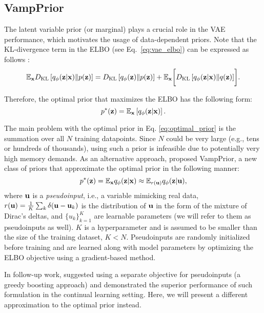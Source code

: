 \subsection{VampPrior}
The latent variable prior (or marginal) plays a crucial role in the VAE performance, which motivates the usage of data-dependent priors. 
Note that the KL-divergence term in the ELBO (see Eq.~\ref{eq:vae_elbo}) can be expressed as follows \citep{hoffman2016elbo}:
\begin{equation}
    \mathbb{E}_{{\mathbf{x}}} D_{\mathrm{KL}}\left[q_{\phi}({\mathbf{z}}|{\mathbf{x}})\|p({\mathbf{z}})\right] = D_{\mathrm{KL}}\left[q_{\phi}({\mathbf{z}})\| p({\mathbf{z}})\right] + \mathbb{E}_{{\mathbf{x}}} \biggl[ D_{\mathrm{KL}}\left[q_{\phi}({\mathbf{z}}|{\mathbf{x}})\|q({\mathbf{z}})\right] \biggr] .
\end{equation}

Therefore, the optimal prior that maximizes the ELBO has the following form:
\begin{equation}\label{eq:optimal_prior}
    p^*(\rvz) = \mathbb{E}_{\rvx} \left[ q_{\phi}(\rvz|\rvx) \right].
\end{equation}

The main problem with the optimal prior in Eq. \ref{eq:optimal_prior} is the summation over all $N$ training datapoints. Since $N$ could be very large (e.g., tens or hundreds of thousands), using such a prior is infeasible due to potentially very high memory demands. As an alternative approach, \cite{tomczak2018vae} proposed VampPrior, a new class of priors that approximate the optimal prior in the following manner:
\begin{equation} \label{eq:vamp_prior_approx}
    p^*(\rvz) = \mathbb{E}_{\rvx} q_{\phi}(\rvz|\rvx) \approx \mathbb{E}_{r(\rvu)} q_{\phi}(\rvz|\rvu),
\end{equation}
where ${\mathbf{u}}$ is a \textit{pseudoinput}, i.e., a variable mimicking real data, $r({\mathbf{u}}) =\frac{1}{K}\sum_k \delta({\mathbf{u}} - {\mathbf{u}}_k)$ is the distribution of ${\mathbf{u}}$ in the form of the mixture of Dirac's deltas, and $\{u_k\}_{k=1}^K$ are learnable parameters (we will refer to them as pseudoinputs as well). $K$ is a hyperparameter and is assumed to be smaller than the size of the training dataset, $K < N$. Pseudoinputs are randomly initialized before training and are learned along with model parameters by optimizing the ELBO objective using a gradient-based method. 

In follow-up work, \cite{egorov2021boovae} suggested using a separate objective for pseudoinputs (a greedy boosting approach) and demonstrated the superior performance of such formulation in the continual learning setting. Here, we will present a different approximation to the optimal prior instead.


